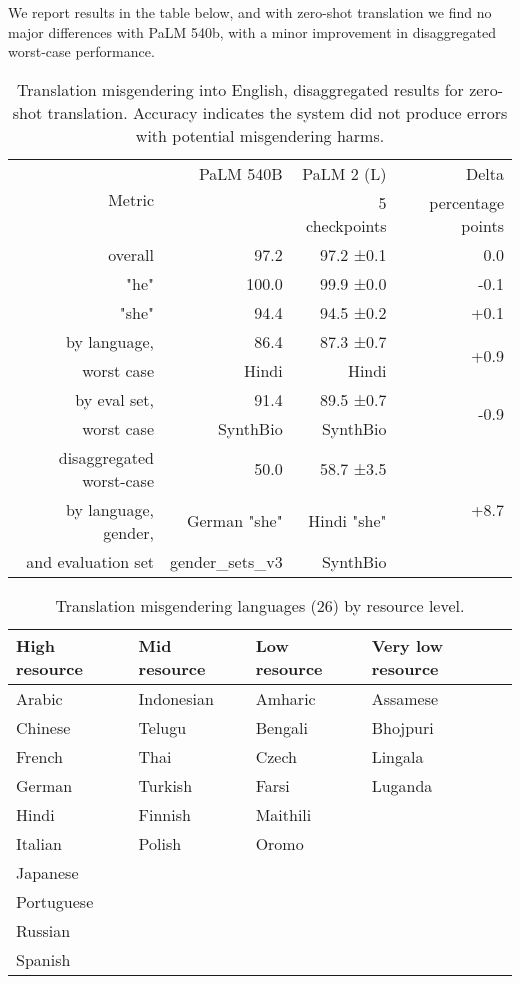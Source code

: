 We report results in the table below, and with zero-shot translation we find no major differences with PaLM 540b, with a minor improvement in disaggregated worst-case performance.
\begin{table}[H]
\centering
\caption{Translation misgendering into English, disaggregated results for zero-shot translation.
Accuracy indicates the system did not produce errors with potential misgendering harms.}
\small
\begin{tabular}{rrrr}
\toprule
    \multirow{2}{*}{Metric} & PaLM 540B & PaLM 2 (L) & Delta \\
    & & 5 checkpoints & percentage points \\
    \midrule
    overall & 97.2 & 97.2 ±0.1 & 0.0 \\
    \midrule
    "he" & 100.0 & 99.9 ±0.0 & -0.1 \\
    \midrule
    "she" & 94.4 & 94.5 ±0.2 & +0.1 \\
    \midrule
    by language, & 86.4 & 87.3 ±0.7 & \multirow{2}{*}{+0.9} \\
    worst case & Hindi & Hindi & \\
    \midrule
    by eval set, & 91.4 & 89.5 ±0.7 & \multirow{2}{*}{-0.9} \\
    worst case & SynthBio & SynthBio & \\
    \midrule
    disaggregated worst-case &  50.0 &  58.7 ±3.5 & \multirow{3}{*}{+8.7} \\
    by language, gender, & German "she"  & Hindi "she" & \\
    and evaluation set & gender\_sets\_v3 & SynthBio & \\
    \bottomrule
\end{tabular}

\label{tab:rai-translation-misgendering-to-english}
\end{table}


\begin{table}[H]
\centering
\caption{Translation misgendering languages (26) by resource level.}
\small
\begin{tabular}{llll}
\toprule
    High resource & Mid resource & Low resource & Very low resource \\
    \midrule
    Arabic & Indonesian & Amharic & Assamese \\
    Chinese & Telugu & Bengali & Bhojpuri \\
    French & Thai & Czech & Lingala \\
    German & Turkish & Farsi & Luganda \\
    Hindi & Finnish & Maithili & \\
    Italian & Polish & Oromo & \\
    Japanese & & & \\
    Portuguese & & & \\
    Russian & & & \\
    Spanish & & & \\
    \bottomrule
\end{tabular}

\label{tab:rai-translation-misgendering-languages}
\end{table}

